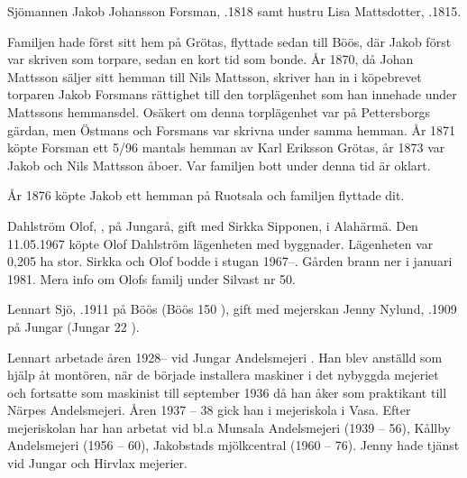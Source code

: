 Sjömannen Jakob Johansson Forsman, .1818 samt hustru Lisa Mattsdotter, .1815.
\begin{jhchildren}
  \item {}
  \item {}
  \item {}
\end{jhchildren}
Familjen hade först sitt hem på Grötas, flyttade sedan till Böös, där Jakob först var skriven som torpare, sedan en kort tid som bonde. År 1870, då Johan Mattsson säljer sitt hemman till Nils Mattsson, skriver han in i köpebrevet torparen Jakob Forsmans rättighet till den torplägenhet som han innehade under Mattssons hemmansdel. Osäkert om denna torplägenhet var på Pettersborgs gärdan, men Östmans och Forsmans var skrivna under samma hemman. År 1871 köpte Forsman ett 5/96 mantals hemman av Karl Eriksson Grötas, år 1873 var Jakob och Nils Mattsson åboer. Var familjen bott under denna tid är oklart.

År 1876 köpte Jakob ett hemman på Ruotsala och familjen flyttade dit.




Dahlström Olof, , på Jungarå, gift med Sirkka Sipponen,  i Alahärmä. Den 11.05.1967 köpte Olof Dahlström lägenheten med byggnader. Lägenheten var 0,205 ha stor. Sirkka och Olof bodde i stugan 1967--. Gården brann ner i januari 1981. Mera info om Olofs familj under Silvast nr 50.


Lennart Sjö, .1911 på Böös (Böös 150 ), gift med mejerskan Jenny Nylund, .1909 på Jungar (Jungar 22 ).
\begin{jhchildren}
  \item {}
  \item {}
\end{jhchildren}
Lennart arbetade åren 1928-- vid Jungar Andelsmejeri . Han blev anställd som hjälp åt montören, när de började installera maskiner i det nybyggda mejeriet och fortsatte som maskinist till september 1936 då han åker som praktikant till Närpes Andelsmejeri. Åren 1937 – 38 			gick han i mejeriskola i Vasa. Efter mejeriskolan har han arbetat vid bl.a Munsala Andelsmejeri (1939 – 56), Kållby Andelsmejeri (1956 – 60), Jakobstads mjölkcentral (1960 – 76). Jenny hade tjänst vid Jungar och Hirvlax mejerier.

